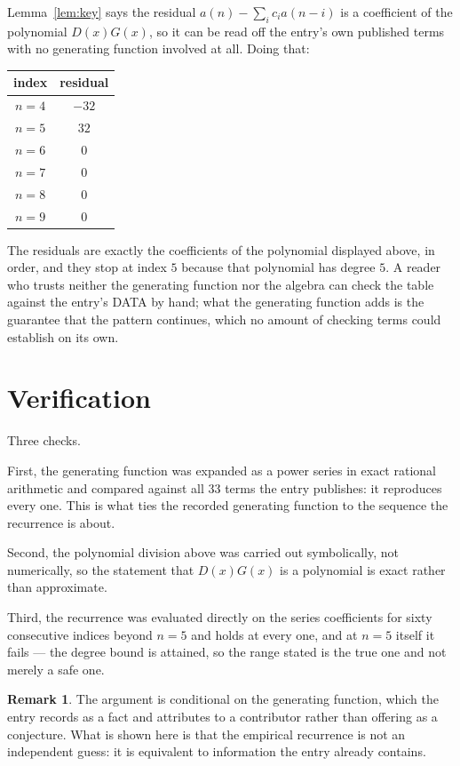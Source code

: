 \documentclass[11pt,a4paper]{article}
\theoremstyle{plain}
\theoremstyle{definition}
\newtheorem{remark}[theorem]{Remark}
\begin{document}
Lemma~\ref{lem:key} says the residual $a(n)-\sum_ic_ia(n-i)$ is a coefficient of the
polynomial $D(x)G(x)$, so it can be read off the entry's own published terms with no
generating function involved at all. Doing that:
\begin{center}
\begin{tabular}{cc}
index & residual \\ \hline
$n=4$ & $-32$ \\
$n=5$ & $32$ \\
$n=6$ & $0$ \\
$n=7$ & $0$ \\
$n=8$ & $0$ \\
$n=9$ & $0$
\end{tabular}
\end{center}
The residuals are exactly the coefficients of the polynomial displayed above, in order, and
they stop at index $5$ because that polynomial has degree $5$. A reader who trusts
neither the generating function nor the algebra can check the table against the entry's DATA
by hand; what the generating function adds is the guarantee that the pattern continues, which
no amount of checking terms could establish on its own.

\section{Verification}

Three checks.

First, the generating function was expanded as a power series in exact rational arithmetic and
compared against all $33$ terms the entry publishes: it reproduces every one. This is
what ties the recorded generating function to the sequence the recurrence is about.

Second, the polynomial division above was carried out symbolically, not numerically, so the
statement that $D(x)G(x)$ is a polynomial is exact rather than approximate.

Third, the recurrence was evaluated directly on the series coefficients for sixty consecutive
indices beyond $n=5$ and holds at every one, and at $n=5$ itself it fails --- the
degree bound is attained, so the range stated is the true one and not merely a safe one.

\begin{remark}
The argument is conditional on the generating function, which the entry records as a fact and
attributes to a contributor rather than offering as a conjecture. What is shown here is that
the empirical recurrence is not an independent guess: it is equivalent to information the
entry already contains.
\end{remark}
\end{document}
